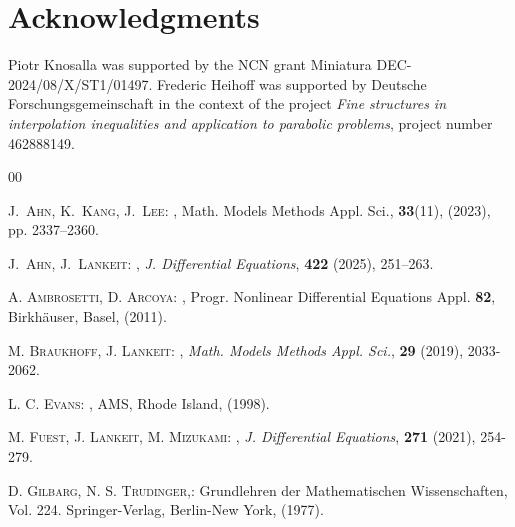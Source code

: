\documentclass[12pt,a4paper]{amsart}
\theoremstyle{definition}
\theoremstyle{remark}
\numberwithin{equation}{section}
\numberwithin{theorem}{section}
\begin{document}
\section*{Acknowledgments}


Piotr Knosalla was supported by the NCN grant Miniatura DEC-2024/08/X/ST1/01497. Frederic Heihoff was supported by Deutsche Forschungsgemeinschaft in the context of the project \emph{Fine structures in interpolation inequalities and application to parabolic problems}, project number 462888149.







\begin{thebibliography}{00}



\textsc{J.~Ahn, K.~Kang, J.~Lee}:
,
\newblock Math. Models Methods Appl. Sci., \textbf{33}(11), (2023), pp. 2337--2360.

\textsc{J.~Ahn, J.~Lankeit}:
,
\newblock \emph{J. Differential Equations}, \textbf{422} (2025), 251--263.

\newblock \textsc{A. Ambrosetti, D. Arcoya}: 
,
\newblock
Progr. Nonlinear Differential Equations Appl. \textbf{82}, Birkh{\"a}user, Basel, (2011).

\newblock \textsc{M. Braukhoff, J. Lankeit}:
,
\newblock \emph{Math. Models Methods Appl. Sci.}, \textbf{29} (2019), 2033-2062.


\newblock \textsc{L. C. Evans}:
,  
\newblock AMS, Rhode Island, (1998).


\newblock \textsc{M. Fuest, J. Lankeit, M. Mizukami}:
,
\newblock \emph{J. Differential Equations}, \textbf{271} (2021), 254-279.

\textsc{D. Gilbarg, N. S. Trudinger,}:
\newblock Grundlehren der Mathematischen Wissenschaften, Vol. 224. Springer-Verlag, Berlin-New
York, (1977).


\end{thebibliography}
\end{document}
